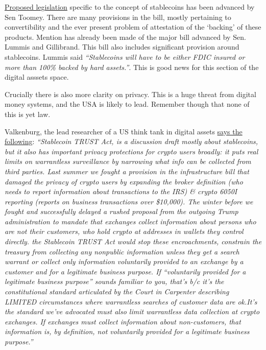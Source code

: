 \href{https://www.americanbanker.com/news/toomey-unveils-stablecoin-bill-granting-occ-authority-for-payments-charter}{Proposed legislation} specific to the concept of stablecoins has been advanced by Sen Toomey. There are many provisions in the bill, mostly pertaining to convertibility and the ever present problem of attestation of the `backing' of these products. Mention has already been made of the major bill advanced by Sen. Lummis and Gillibrand. This bill also includes significant provision around stablecoins. Lummis said \textit{``Stablecoins will have to be either FDIC insured or more than 100\% backed by hard assets.''}. This is good news for this section of the digital asssets space.\par
Crucially there is also more clarity on privacy. This is a huge threat from digital money systems, and the USA is likely to lead. Remember though that none of this is yet law.\par 
Valkenburg, the lead researcher of a US think tank in digital assets \href{https://twitter.com/valkenburgh/status/1511783339065237521}{says the following}: \textit{``Stablecoin TRUST Act, is a discussion draft mostly about stablecoins, but it also has important privacy protections for crypto users broadly: it puts real limits on warrantless surveillance by narrowing what info can be collected from third parties. Last summer we fought a provision in the infrastructure bill that damaged the privacy of crypto users by expanding the broker definition (who needs to report information about transactions to the IRS) \& crypto 6050I reporting (reports on business transactions over \$10,000). The winter before we fought and successfully delayed a rushed proposal from the outgoing Trump administration to mandate that exchanges collect information about persons who are not their customers, who hold crypto at addresses in wallets they control directly. the Stablecoin TRUST Act would stop these encroachments, constrain the treasury from collecting any nonpublic information unless they get a search warrant or collect only information voluntarily provided to an exchange by a customer and for a legitimate business purpose. If “voluntarily provided for a legitimate business purpose” sounds familiar to you, that’s b/c it's the constitutional standard articulated by the Court in Carpenter describing LIMITED circumstances where warrantless searches of customer data are ok.It’s the standard we’ve advocated must also limit warrantless data collection at crypto exchanges. If exchanges must collect information about non-customers, that information is, by definition, not voluntarily provided for a legitimate business purpose.''}\par

